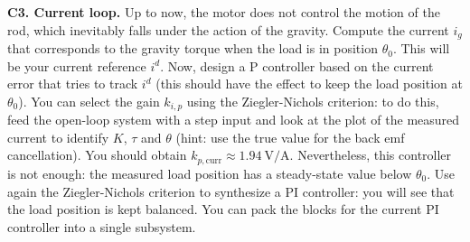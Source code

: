 \documentclass[11pt]{article}
\begin{document}
\par
\textbf{C3. Current loop.} 
Up to now, the motor does not control the motion of the rod, 
which inevitably falls under the action of the gravity. Compute the current $i_g$ that corresponds to the 
gravity torque when the load is in position $\theta_0$. This will be your current reference $i^d$.
Now, design a P controller based on the current error that tries to track $i^d$ 
(this should have the effect to keep the load position at $\theta_0$). 
You can select the gain $k_{i,p}$ using the Ziegler-Nichols criterion: to do this, 
feed the open-loop system with a step input and look at the plot of the 
measured current to identify $K$, $\tau$ and $\theta$  
(hint: use the true value for the back emf cancellation). You should obtain $k_{p, \mathrm{curr}} \approx 1.94 \ \mathrm{V/A}$. 
Nevertheless, this controller is not enough: the measured load position has a steady-state value below $\theta_0$. 
Use again the Ziegler-Nichols criterion to synthesize a PI controller: 
you will see that the load position is kept balanced. 
You can pack the blocks for the current PI controller into a single subsystem.
\end{document}
